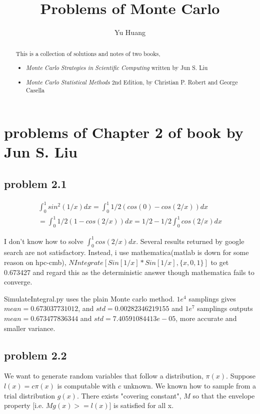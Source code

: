 \documentclass[a4paper,10pt]{article}
\title{Problems of Monte Carlo}
\author{Yu Huang}
\begin{document}
\maketitle

\begin{abstract}
This is a collection of solutions and notes of two books,
\begin{itemize}
\item \emph{Monte Carlo Strategies in Scientific Computing} written by Jun S. Liu
\item \emph{Monte Carlo Statistical Methods} 2nd Edition, by Christian P. Robert and George Casella
\end{itemize}
\end{abstract}

\tableofcontents

\section{problems of Chapter 2 of book by Jun S. Liu}
\subsection{problem 2.1}

\begin{eqnarray*}
\int_{0}^{1} sin^2(1/x)dx = \int_{0}^{1}1/2(cos(0)-cos(2/x))dx \\
=\int_{0}^{1}1/2(1-cos(2/x))dx = 1/2 - 1/2\int_{0}^{1}cos(2/x)dx
\end{eqnarray*}


I don't know how to solve $\int_{0}^{1}cos(2/x)dx$. Several results returned by google search are not satisfactory. Instead, i use mathematica(matlab is down for some reason on hpc-cmb), $NIntegrate[Sin[1/x]*Sin[1/x], \{x, 0, 1\}]$ to get 0.673427 and regard this as the deterministic answer though mathematica fails to converge.

SimulateIntegral.py uses the plain Monte carlo method. $1e^4$ samplings gives $mean=0.673037731012$, and $std=0.00282346219155$ and $1e^7$ samplings outputs $mean=0.673477836344$ and $std=7.40591084413e-05$, more accurate and smaller variance.

\subsection{problem 2.2}
We want to generate random variables that follow a distribution, $\pi(x)$. Suppose $l(x)=c\pi(x)$ is computable with $c$ unknown. We known how to sample from a trial distribution $g(x)$. There exists "covering constant", $M$ so that the envelope property [i.e. $Mg(x)>=l(x)$] is satisfied for all x.
\end{document}
